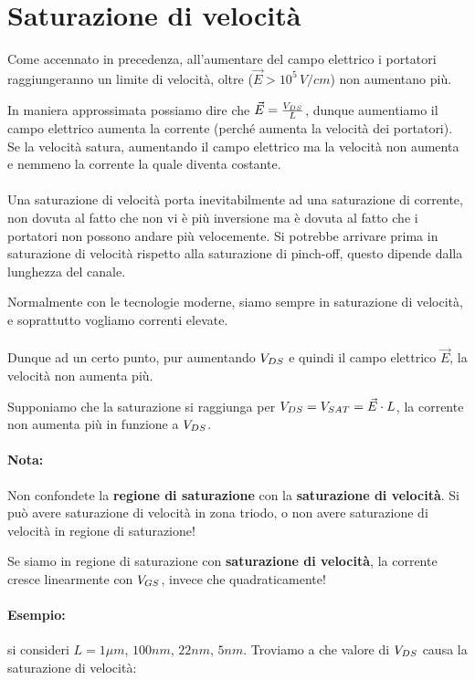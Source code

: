 \newpage
\section{Saturazione di velocità}
Come accennato in precedenza, all'aumentare del campo elettrico  i portatori raggiungeranno un limite di velocità, oltre ($\vec{E} > 10^5\,V/cm$) non aumentano più.

In maniera approssimata possiamo dire che $\vec{E} = \frac{V_{DS}}{L}$, dunque aumentiamo il campo elettrico aumenta la corrente (perché aumenta la velocità dei portatori). Se la velocità satura, aumentando il campo elettrico ma la velocità non aumenta e nemmeno la corrente la quale diventa costante.
\paragraph{}
Una saturazione di velocità porta inevitabilmente ad una saturazione di corrente, non dovuta al fatto che non vi è più inversione ma è dovuta al fatto che i portatori non possono andare più velocemente. Si potrebbe arrivare prima in saturazione di velocità rispetto alla saturazione di pinch-off, questo dipende dalla lunghezza del canale.

Normalmente con le tecnologie moderne, siamo sempre in saturazione di velocità, e soprattutto vogliamo correnti elevate.

\paragraph{}

Dunque ad un	certo	punto,	pur	aumentando	$V_{DS}$ e	quindi	il	campo elettrico	$\vec{E}$,	la	velocità	non	aumenta	più.

Supponiamo che la saturazione si raggiunga per $V_{DS} = V_{SAT} = \vec{E}\cdot L$, la corrente non aumenta più in funzione a $V_{DS}$.

\paragraph{Nota:}
Non	confondete	la	\textbf{regione	di	saturazione} con	la	\textbf{saturazione	di	velocità}.	
Si	può	avere	saturazione	di	velocità	in	zona	triodo,	o	non	avere	
saturazione	di	velocità	in	regione	di	saturazione!

Se	siamo	in	regione	di	saturazione	con	\textbf{saturazione	di	velocità},	la	
corrente	cresce	linearmente	con $V_{GS}$,	invece	che	quadraticamente!

\paragraph{Esempio: } si consideri $L = 1\mu m$, $100 nm$, $22 nm$, $5nm$. Troviamo a che valore di $V_{DS}$ causa la saturazione di velocità:

